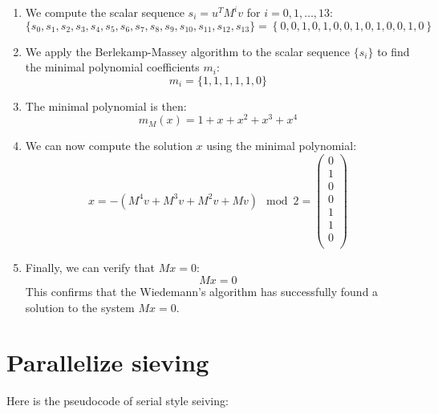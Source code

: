 \documentclass[a4paper, 11pt]{article}
\begin{document}
\begin{enumerate}
    \item We compute the scalar sequence $s_i = u^T M^i v$ for $i=0,1,\dots,13$:
    \begin{equation}
        \{s_0, s_1, s_2, s_3, s_4, s_5, s_6, s_7, s_8, s_9, s_{10}, s_{11}, s_{12}, s_{13} \} 
        = 
        \left\{0,0,1,0,1,0,0,1,0,1,0,0,1,0\right\}
    \end{equation}
    \item We apply the Berlekamp-Massey algorithm to the scalar sequence $\{s_i\}$ to find the minimal polynomial coefficients $m_i$:
    \begin{equation}
        m_i = \{1, 1, 1, 1, 1, 0\}
    \end{equation}
    \item The minimal polynomial is then:
    \begin{equation}
        m_M(x) = 1 + x + x^2 + x^3 + x^4
    \end{equation}
    \item We can now compute the solution $x$ using the minimal polynomial:
    \begin{equation}
        x = -(M^4 v + M^3 v + M^2 v + M v) \mod 2
        = \begin{pmatrix}
            0 \\
            1 \\
            0 \\
            0 \\
            1 \\
            1 \\
            0 \\
        \end{pmatrix}
    \end{equation}
    \item Finally, we can verify that $Mx = 0$:
    \begin{equation}
        Mx = 0
    \end{equation}
    This confirms that the Wiedemann's algorithm has successfully found a solution to the system $Mx = 0$.
\end{enumerate}

\newpage

\section{Parallelize sieving}
Here is the pseudocode of serial style seiving:
\end{document}
